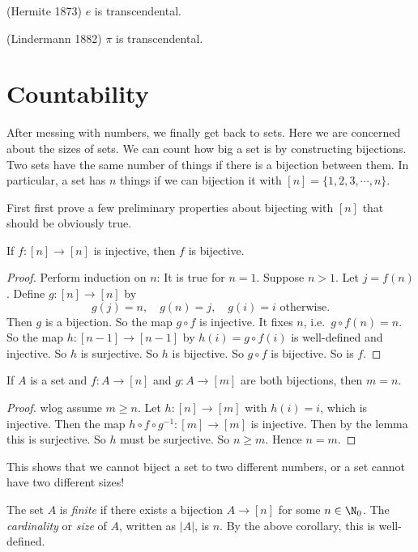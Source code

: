 \documentclass[a4paper]{article}
\begin{document}
\begin{thm}
  (Hermite 1873) $e$ is transcendental.
\end{thm}
\begin{thm}
  (Lindermann 1882) $\pi$ is transcendental.
\end{thm}

\section{Countability}
After messing with numbers, we finally get back to sets. Here we are concerned about the sizes of sets. We can count how big a set is by constructing bijections. Two sets have the same number of things if there is a bijection between them. In particular, a set has $n$ things if we can bijection it with $[n] = \{1, 2, 3, \cdots, n\}$.

First first prove a few preliminary properties about bijecting with $[n]$ that should be obviously true.

\begin{lemma}
  If $f:[n] \to [n]$ is injective, then $f$ is bijective.
\end{lemma}

\begin{proof}
  Perform induction on $n$: It is true for $n = 1$. Suppose $n > 1$. Let $j = f(n)$. Define $g: [n]\to [n]$ by
  \[
    g(j) = n,\quad g(n) = j, \quad g(i) = i \text{ otherwise}.
  \]
  Then $g$ is a bijection. So the map $g\circ f$ is injective. It fixes $n$, i.e.\ $g\circ f(n) = n$. So the map $h:[n - 1]\to [n - 1]$ by $h(i) = g\circ f(i)$ is well-defined and injective. So $h$ is surjective. So $h$ is bijective. So $g\circ f$ is bijective. So is $f$.
\end{proof}

\begin{cor}
  If $A$ is a set and $f: A\to [n]$ and $g: A\to [m]$ are both bijections, then $m = n$.
\end{cor}

\begin{proof}
  wlog assume $m \geq n$. Let $h: [n]\to [m]$ with $h(i) = i$, which is injective. Then the map $h\circ f\circ g^{-1}: [m]\to [m]$ is injective. Then by the lemma this is surjective. So $h$ must be surjective. So $n\geq m$. Hence $n = m$.
\end{proof}
This shows that we cannot biject a set to two different numbers, or a set cannot have two different sizes!

\begin{defi}
  The set $A$ is \emph{finite} if there exists a bijection $A\to [n]$ for some $n\in\N_0$. The \emph{cardinality} or \emph{size} of $A$, written as $|A|$, is $n$. By the above corollary, this is well-defined.
\end{defi}
\end{document}
